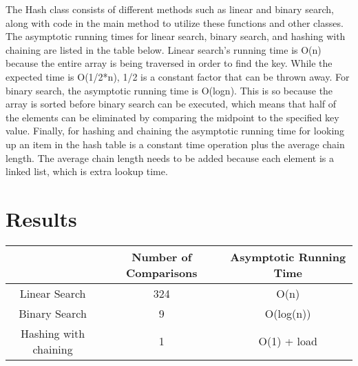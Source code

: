 \documentclass{article}
\begin{document}
\noindent The Hash class consists of different methods such as linear and binary search, along with code in the main method to utilize these functions and other classes. The asymptotic running times for linear search, binary search, and hashing with chaining are listed in the table below. Linear search's running time is O(n) because the entire array is being traversed in order to find the key. While the expected time is O(1/2*n), 1/2 is a constant factor that can be thrown away. For binary search, the asymptotic running time is O(logn). This is so because the array is sorted before binary search can be executed, which means that half of the elements can be eliminated by comparing the midpoint to the specified key value. Finally, for hashing and chaining the asymptotic running time for looking up an item in the hash table is a constant time operation plus the average chain length. The average chain length needs to be added because each element is a linked list, which is extra lookup time.  

\section{Results}
\begin{center}
\begin{tabular}{||c c c||} 
 \hline
  & Number of Comparisons & Asymptotic Running Time  \\ [0.5ex] 
 \hline\hline
 Linear Search & 324 & O(n) \\ 
 \hline
 Binary Search & 9 & O(log(n))\\
 \hline
 Hashing with chaining & 1 & O(1) + load \\
 \hline
\end{tabular}
\end{center}
\end{document}
